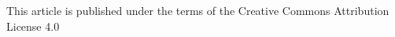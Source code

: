 \documentclass{wseas}
\begin{document}
\flushleft {}

\par { \noindent This article is published under the terms of the Creative Commons Attribution License 4.0\\
\href{https://creativecommons.org/licenses/by/4.0/deed.en\_US}{\color{blue}{https://creativecommons.org/licenses/by/4.0/deed.en\break\_US}} }
\end{document}
